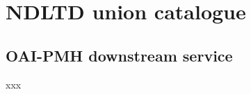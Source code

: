 \section[NDLTD union catalog]{NDLTD union catalogue}
\label{sec:case-studies:ndltd-union-catalog}

%
%
%
\subsection{OAI-PMH downstream service}
\label{sec:case-studies:ndltd-union-catalog:oaipmh-downstream-service}

xxx

